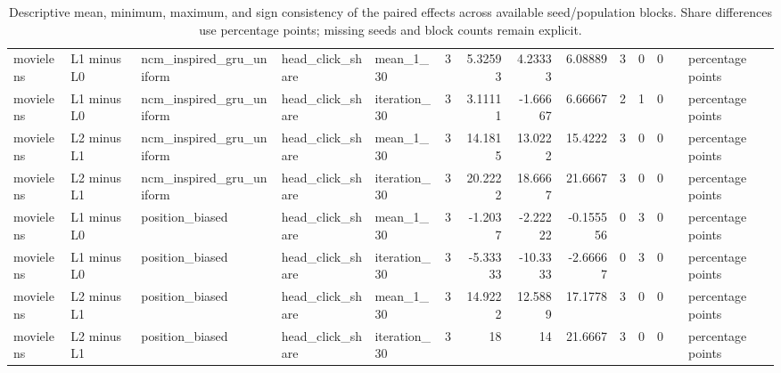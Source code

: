 \begin{table}[htbp!]
\begin{tabular}{lllllrrrrrrrll}
movielens & L1 minus L0 & ncm\_inspired\_gru\_uniform & head\_click\_share & mean\_1\_30 & 3 & 5.32593 & 4.23333 & 6.08889 & 3 & 0 & 0 &  & percentage points \\
movielens & L1 minus L0 & ncm\_inspired\_gru\_uniform & head\_click\_share & iteration\_30 & 3 & 3.11111 & -1.66667 & 6.66667 & 2 & 1 & 0 &  & percentage points \\
movielens & L2 minus L1 & ncm\_inspired\_gru\_uniform & head\_click\_share & mean\_1\_30 & 3 & 14.1815 & 13.0222 & 15.4222 & 3 & 0 & 0 &  & percentage points \\
movielens & L2 minus L1 & ncm\_inspired\_gru\_uniform & head\_click\_share & iteration\_30 & 3 & 20.2222 & 18.6667 & 21.6667 & 3 & 0 & 0 &  & percentage points \\
movielens & L1 minus L0 & position\_biased & head\_click\_share & mean\_1\_30 & 3 & -1.2037 & -2.22222 & -0.155556 & 0 & 3 & 0 &  & percentage points \\
movielens & L1 minus L0 & position\_biased & head\_click\_share & iteration\_30 & 3 & -5.33333 & -10.3333 & -2.66667 & 0 & 3 & 0 &  & percentage points \\
movielens & L2 minus L1 & position\_biased & head\_click\_share & mean\_1\_30 & 3 & 14.9222 & 12.5889 & 17.1778 & 3 & 0 & 0 &  & percentage points \\
movielens & L2 minus L1 & position\_biased & head\_click\_share & iteration\_30 & 3 & 18 & 14 & 21.6667 & 3 & 0 & 0 &  & percentage points \\
\hline
\end{tabular}
\caption{Descriptive mean, minimum, maximum, and sign consistency of the paired effects across available seed/population blocks. Share differences use percentage points; missing seeds and block counts remain explicit.}
\label{chap:results:tab:rq2_seed_consistency_head_click_share}
\end{table}
